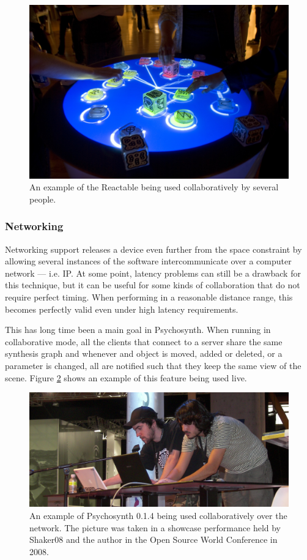 \begin{figure}[h!]
\centering
\includegraphics[width=.7\textwidth]{pic/reactable.jpg}
\caption{An example of the Reactable being used collaboratively by
  several people.}
\label{fig:reactable}
\end{figure}

\subsubsection{Networking}

Networking support releases a device even further
from the space constraint by allowing several instances of the
software intercommunicate over a computer network --- i.e. IP. At some
point, latency problems can still be a drawback for this technique,
but it can be useful for some kinds of collaboration that do not
require perfect timing. When performing in a reasonable distance
range, this becomes perfectly valid even under high latency
requirements.

This has long time been a main goal in Psychosynth. When running in
collaborative mode, all the clients that connect to a server share the
same synthesis graph and whenever and object is moved, added or
deleted, or a parameter is changed, all are notified such that they
keep the same view of the scene. Figure \ref{fig:collab} shows an
example of this feature being used live.

\begin{figure}[h!]
\centering
\includegraphics[width=.9\textwidth]{pic/collab.jpg}
\caption[An example of Psychosynth 0.1.4 being used collaboratively
over the network.]{An example of Psychosynth 0.1.4 being used
  collaboratively over the network. The picture was taken in a
  showcase performance held by Shaker08 and the author in the Open
  Source World Conference in 2008.}
\label{fig:collab}
\end{figure}

